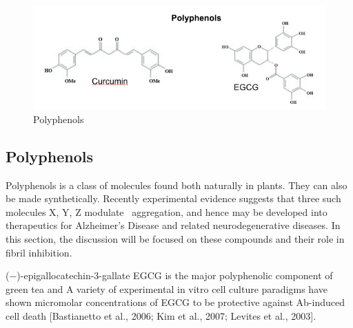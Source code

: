


\begin{figure}
\centering
\includegraphics[width=6in]{figures/introduction/polyphenols.png}
\caption[Small molecule binders]{Polyphenols}
\label{fig:polyphenols}
\end{figure}

\subsection{Polyphenols}
Polyphenols is a class of molecules found both naturally in plants. They can also be made synthetically. Recently experimental evidence suggests that three such molecules X, Y, Z modulate \abeta\ aggregation, and hence may be developed into therapeutics for Alzheimer's Disease and related neurodegenerative diseases.  In this section, the discussion will be focused on these compounds and their role in fibril inhibition.

(−)-epigallocatechin-3-gallate EGCG is the major polyphenolic component of green tea and  A variety of experimental in vitro cell culture paradigms have shown micromolar concentrations of EGCG to be protective against Ab-induced cell death [Bastianetto et al., 2006; Kim et al., 2007; Levites et al., 2003].

